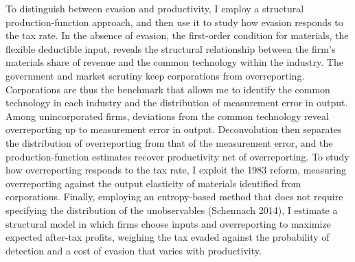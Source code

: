 \documentclass[
  12pt]{article}
\begin{document}
To distinguish between evasion and productivity, I employ a structural
production-function approach, and then use it to study how evasion
responds to the tax rate. In the absence of evasion, the first-order
condition for materials, the flexible deductible input, reveals the
structural relationship between the firm's materials share of revenue
and the common technology within the industry. The government and market
scrutiny keep corporations from overreporting. Corporations are thus the
benchmark that allows me to identify the common technology in each
industry and the distribution of measurement error in output. Among
unincorporated firms, deviations from the common technology reveal
overreporting up to measurement error in output. Deconvolution then
separates the distribution of overreporting from that of the measurement
error, and the production-function estimates recover productivity net of
overreporting. To study how overreporting responds to the tax rate, I
exploit the 1983 reform, measuring overreporting against the output
elasticity of materials identified from corporations. Finally, employing
an entropy-based method that does not require specifying the
distribution of the unobservables (Schennach 2014), I estimate a
structural model in which firms choose inputs and overreporting to
maximize expected after-tax profits, weighing the tax evaded against the
probability of detection and a cost of evasion that varies with
productivity.
\end{document}
